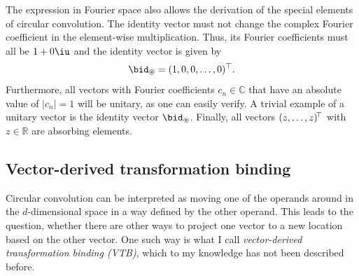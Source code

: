The expression in Fourier space also allows the derivation of the special elements of circular convolution.
The identity vector must not change the complex Fourier coefficient in the element-wise multiplication.
Thus, its Fourier coefficients must all be $1 + 0\iu$ and the identity vector is given by
\begin{equation}
    \bid_{\circledast} = (1, 0, 0, \dotsc, 0)\Tr \text{.}
\end{equation}
Furthermore, all vectors with Fourier coefficients $c_n \in \mathbb{C}$ that have an absolute value of $\left|c_n\right| = 1$ will be unitary, as one can easily verify.
A trivial example of a unitary vector is the identity vector $\bid_{\circledast}$.
Finally, all vectors $(z, \dotsc, z)\!^{\top}$ with $z \in \mathbb{R}$ are absorbing elements.

\subsection{Vector-derived transformation binding}
Circular convolution can be interpreted as moving one of the operands around in the $d$-dimensional space in a way defined by the other operand.
This leads to the question, whether there are other ways to project one vector to a new location based on the other vector.
One such way is what I call \emph{vector-derived transformation binding (VTB)}, which to my knowledge has not been described before.
